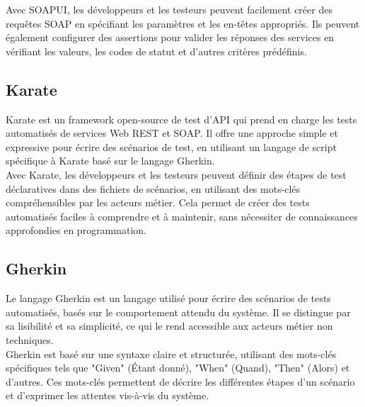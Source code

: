 Avec SOAPUI, les développeurs et les testeurs peuvent facilement créer des requêtes SOAP en spécifiant les paramètres et les en-têtes appropriés. Ils peuvent également configurer des assertions pour valider les réponses des services en vérifiant les valeurs, les codes de statut et d'autres critères prédéfinis.

\subsection*{Karate}
Karate est un framework open-source de test d'API qui prend en charge les tests automatisés de services Web REST et SOAP. Il offre une approche simple et expressive pour écrire des scénarios de test, en utilisant un langage de script spécifique à Karate basé sur le langage Gherkin.\\

Avec Karate, les développeurs et les testeurs peuvent définir des étapes de test déclaratives dans des fichiers de scénarios, en utilisant des mots-clés compréhensibles par les acteurs métier. Cela permet de créer des tests automatisés faciles à comprendre et à maintenir, sans nécessiter de connaissances approfondies en programmation.

\subsection*{Gherkin}
Le langage Gherkin est un langage utilisé pour écrire des scénarios de tests automatisés, basés sur le comportement attendu du système. Il se distingue par sa lisibilité et sa simplicité, ce qui le rend accessible aux acteurs métier non techniques.\\

Gherkin est basé sur une syntaxe claire et structurée, utilisant des mots-clés spécifiques tels que "Given" (Étant donné), "When" (Quand), "Then" (Alors) et d'autres. Ces mots-clés permettent de décrire les différentes étapes d'un scénario et d'exprimer les attentes vis-à-vis du système.


